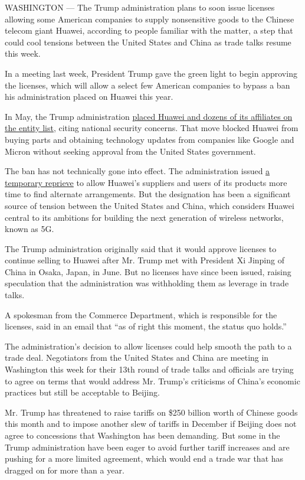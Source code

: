 WASHINGTON --- The Trump administration plans to soon issue licenses
allowing some American companies to supply nonsensitive goods to the
Chinese telecom giant Huawei, according to people familiar with the
matter, a step that could cool tensions between the United States and
China as trade talks resume this week.

In a meeting last week, President Trump gave the green light to begin
approving the licenses, which will allow a select few American companies
to bypass a ban his administration placed on Huawei this year.

In May, the Trump administration
\href{https://www.nytimes.com/2019/05/15/business/huawei-ban-trump.html?module=inline}{placed
Huawei and dozens of its affiliates on the entity list}, citing national
security concerns. That move blocked Huawei from buying parts and
obtaining technology updates from companies like Google and Micron
without seeking approval from the United States government.

The ban has not technically gone into effect. The administration issued
\href{https://www.nytimes.com/2019/08/19/us/politics/huawei-trump.html}{a
temporary reprieve} to allow Huawei's suppliers and users of its
products more time to find alternate arrangements. But the designation
has been a significant source of tension between the United States and
China, which considers Huawei central to its ambitions for building the
next generation of wireless networks, known as 5G.

The Trump administration originally said that it would approve licenses
to continue selling to Huawei after Mr. Trump met with President Xi
Jinping of China in Osaka, Japan, in June. But no licenses have since
been issued, raising speculation that the administration was withholding
them as leverage in trade talks.

A spokesman from the Commerce Department, which is responsible for the
licenses, said in an email that ``as of right this moment, the status
quo holds.''

The administration's decision to allow licenses could help smooth the
path to a trade deal. Negotiators from the United States and China are
meeting in Washington this week for their 13th round of trade talks and
officials are trying to agree on terms that would address Mr. Trump's
criticisms of China's economic practices but still be acceptable to
Beijing.

Mr. Trump has threatened to raise tariffs on \$250 billion worth of
Chinese goods this month and to impose another slew of tariffs in
December if Beijing does not agree to concessions that Washington has
been demanding. But some in the Trump administration have been eager to
avoid further tariff increases and are pushing for a more limited
agreement, which would end a trade war that has dragged on for more than
a year.

